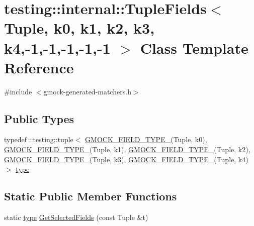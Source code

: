 \hypertarget{classtesting_1_1internal_1_1_tuple_fields_3_01_tuple_00_01k0_00_01k1_00_01k2_00_01k3_00_01k4_00-1_00-1_00-1_00-1_00-1_01_4}{}\section{testing\+:\+:internal\+:\+:Tuple\+Fields$<$ Tuple, k0, k1, k2, k3, k4,-\/1,-\/1,-\/1,-\/1,-\/1 $>$ Class Template Reference}
\label{classtesting_1_1internal_1_1_tuple_fields_3_01_tuple_00_01k0_00_01k1_00_01k2_00_01k3_00_01k4_00-1_00-1_00-1_00-1_00-1_01_4}


{\ttfamily \#include $<$gmock-\/generated-\/matchers.\+h$>$}

\subsection*{Public Types}
\begin{DoxyCompactItemize}
\item 
typedef \+::testing\+::tuple$<$ \hyperlink{gmock-generated-matchers_8h_acf3e27de83a73f0d873da1cd471e505b}{G\+M\+O\+C\+K\+\_\+\+F\+I\+E\+L\+D\+\_\+\+T\+Y\+P\+E\+\_\+}(Tuple, k0), \hyperlink{gmock-generated-matchers_8h_acf3e27de83a73f0d873da1cd471e505b}{G\+M\+O\+C\+K\+\_\+\+F\+I\+E\+L\+D\+\_\+\+T\+Y\+P\+E\+\_\+}(Tuple, k1), \hyperlink{gmock-generated-matchers_8h_acf3e27de83a73f0d873da1cd471e505b}{G\+M\+O\+C\+K\+\_\+\+F\+I\+E\+L\+D\+\_\+\+T\+Y\+P\+E\+\_\+}(Tuple, k2), \hyperlink{gmock-generated-matchers_8h_acf3e27de83a73f0d873da1cd471e505b}{G\+M\+O\+C\+K\+\_\+\+F\+I\+E\+L\+D\+\_\+\+T\+Y\+P\+E\+\_\+}(Tuple, k3), \hyperlink{gmock-generated-matchers_8h_acf3e27de83a73f0d873da1cd471e505b}{G\+M\+O\+C\+K\+\_\+\+F\+I\+E\+L\+D\+\_\+\+T\+Y\+P\+E\+\_\+}(Tuple, k4)$>$ \hyperlink{classtesting_1_1internal_1_1_tuple_fields_3_01_tuple_00_01k0_00_01k1_00_01k2_00_01k3_00_01k4_00-1_00-1_00-1_00-1_00-1_01_4_a0f2600b6a8009ead7c04545648de2033}{type}
\end{DoxyCompactItemize}
\subsection*{Static Public Member Functions}
\begin{DoxyCompactItemize}
\item 
static \hyperlink{classtesting_1_1internal_1_1_tuple_fields_3_01_tuple_00_01k0_00_01k1_00_01k2_00_01k3_00_01k4_00-1_00-1_00-1_00-1_00-1_01_4_a0f2600b6a8009ead7c04545648de2033}{type} \hyperlink{classtesting_1_1internal_1_1_tuple_fields_3_01_tuple_00_01k0_00_01k1_00_01k2_00_01k3_00_01k4_00-1_00-1_00-1_00-1_00-1_01_4_a30807ca848bc2f05bf18c7837a82b9c3}{Get\+Selected\+Fields} (const Tuple \&t)
\end{DoxyCompactItemize}


